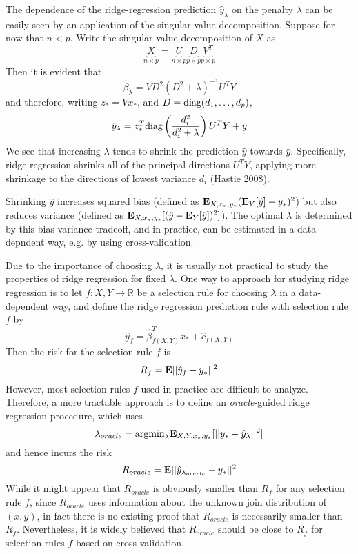 \documentclass[11pt]{article}
\begin{document}
The dependence of the ridge-regression prediction
$\hat{y}_\lambda$ on the penalty $\lambda$ can be easily seen by
an application of the singular-value decomposition.
Suppose for now that $n < p$.
Write the singular-value decomposition of $X$ as
\[
\underbrace{X}_{n \times p} = \underbrace{U}_{n \times p}\underbrace{D}_{p \times p}\underbrace{V^T}_{p \times p}
\]
Then it is evident that
\[
\hat{\beta}_\lambda = V D^2 (D^2 + \lambda)^{-1} U^T Y
\]
and therefore, writing $z_* = V x_*$, and $D = \text{diag}(d_1,\hdots, d_p)$,
\[
\hat{y}_\lambda = z_*^T \text{diag}\left(\frac{d_i^2}{d_i^2 + \lambda}\right) U^T Y + \bar{y}
\]
We see that increasing $\lambda$ tends to shrink the prediction
$\hat{y}$ towards $\bar{y}$.  Specifically, ridge regression shrinks
all of the principal directions $U^T Y$, applying more shrinkage to
the directions of lowest variance $d_i$ (Hastie 2008).

Shrinking $\hat{y}$ increases squared
bias (defined as $\textbf{E}_{X, x_*, y_*}(\textbf{E}_{Y}[\hat{y}] - y_*)^2$) but also reduces
variance (defined as $\textbf{E}_{X, x_*, y_*}[(\hat{y} - \textbf{E}_{Y}[\hat{y}])^2]$).  The
optimal $\lambda$ is determined by this bias-variance tradeoff, and in
practice, can be estimated in a data-depndent way, e.g. by using
cross-validation.

Due to the importance of choosing $\lambda$, it is usually not
practical to study the properties of ridge regression for fixed
$\lambda$.  One way to approach for studying ridge regression is
to let $f: X, Y \to \mathbb{R} $ be a selection rule for choosing
$\lambda$ in a data-dependent way, and define the ridge regression
prediction rule with selection rule $f$ by
\[
\hat{y}_f = \hat{\beta}_{f(X, Y)}^T x_* + \hat{c}_{f(X, Y)}
\]
Then the risk for the selection rule $f$ is
\[
R_f = \textbf{E}||\hat{y}_f - y_*||^2
\]
However, most selection rules $f$ used in practice are difficult to
analyze.  Therefore, a more tractable approach is to define an \emph{oracle}-guided ridge regression procedure, which uses
\[
\lambda_{oracle} = \text{argmin}_{\lambda} \textbf{E}_{X, Y, x_*, y_*}[||y_* - \hat{y}_\lambda||^2]
\]
and hence incurs the risk
\[
R_{oracle} = \textbf{E}||\hat{y}_{\lambda_{oracle}} - y_*||^2
\]
While it might appear that $R_{oracle}$ is obviously smaller than
$R_f$ for any selection rule $f$, since $R_{oracle}$ uses information
about the unknown join distribution of $(x,y)$, in fact there is no
existing proof that $R_{oracle}$ is necessarily smaller than $R_f$.
Nevertheless, it is widely believed that $R_{oracle}$ should be close
to $R_f$ for selection rules $f$ based on cross-validation.
\end{document}
